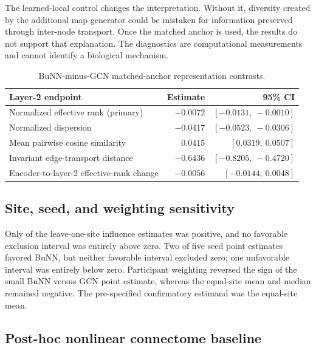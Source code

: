 \documentclass[11pt,a4paper]{article}
\begin{document}
The learned-local control changes the interpretation. Without it, diversity
created by the additional map generator could be mistaken for information
preserved through inter-node transport. Once the matched anchor is used, the
results do not support that explanation. The diagnostics are computational
measurements and cannot identify a biological mechanism.

\begin{table}[htbp]
\centering
\caption{BuNN-minus-GCN matched-anchor representation contrasts.}
\label{tab:representation}
\small
\begin{tabularx}{\textwidth}{@{}Y r r@{}}
\toprule
\textbf{Layer-2 endpoint} & \textbf{Estimate} & \textbf{95\% CI} \\
\midrule
Normalized effective rank (primary) & $-0.0072$ & $[-0.0131,\ -0.0010]$ \\
Normalized dispersion & $-0.0417$ & $[-0.0523,\ -0.0306]$ \\
Mean pairwise cosine similarity & $0.0415$ & $[0.0319,\ 0.0507]$ \\
Invariant edge-transport distance & $-0.6436$ & $[-0.8205,\ -0.4720]$ \\
Encoder-to-layer-2 effective-rank change & $-0.0056$ & $[-0.0144,\ 0.0048]$ \\
\bottomrule
\end{tabularx}
\end{table}

\subsection{Site, seed, and weighting sensitivity}

Only \LeaveOneSitePositive{} of the \StudySites{} leave-one-site influence
estimates was positive, and no favorable exclusion interval was entirely above
zero. Two of five seed point estimates favored BuNN, but neither favorable
interval excluded zero; one unfavorable interval was entirely below zero.
Participant weighting reversed the sign of the small BuNN versus GCN point
estimate, whereas the equal-site mean and median remained negative. The
pre-specified confirmatory estimand was the equal-site mean.



\subsection{Post-hoc nonlinear connectome baseline}
\end{document}
